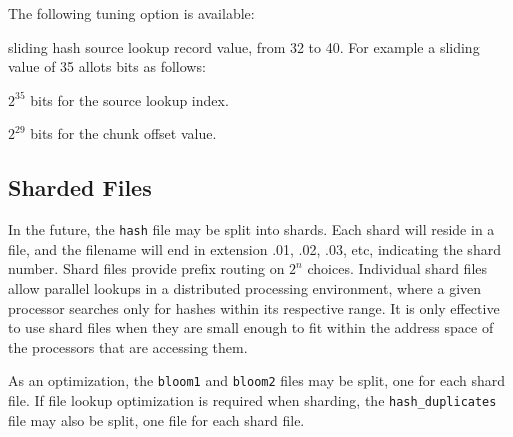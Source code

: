 \documentclass[10pt,twoside]{article}
\begin{document}
The following tuning option is available:
\begin{compactitem}
\item sliding hash source lookup record value, from 32 to 40.
For example a sliding value of 35 allots bits as follows:
\begin{compactitem}
\item \begin{math}2^{35}\end{math} bits for the source lookup index.
\item \begin{math}2^{29}\end{math} bits for the chunk offset value.
\end{compactitem}
\end{compactitem}

\subsection{Sharded Files}
In the future, the \texttt{hash} file may be split into shards.
Each shard will reside in a file, and the filename will end in extension .01, .02, .03, etc,
indicating the shard number.
Shard files provide prefix routing on \begin{math}2^{n}\end{math} choices.
Individual shard files allow parallel lookups in a distributed processing environment,
where a given processor searches only for hashes within its respective range.
It is only effective to use shard files when they are small enough
to fit within the address space of the processors that are accessing them.

As an optimization, the \texttt{bloom1} and \texttt{bloom2} files may be split,
one for each shard file.
If file lookup optimization is required when sharding,
the \texttt{hash\_duplicates} file may also be split,
one file for each shard file.
\end{document}
